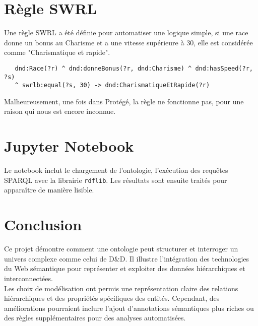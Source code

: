 \documentclass{article}
\newcommand{\cmd}[1]{\texttt{#1}}
\begin{document}
\section{Règle SWRL}

Une règle SWRL a été définie pour automatiser une logique simple, si une race donne un bonus au Charisme et a une vitesse supérieure à 30, elle est considérée comme "Charismatique et rapide".

\begin{lstlisting}
   dnd:Race(?r) ^ dnd:donneBonus(?r, dnd:Charisme) ^ dnd:hasSpeed(?r, ?s)
   ^ swrlb:equal(?s, 30) -> dnd:CharismatiqueEtRapide(?r)
\end{lstlisting}

Malheureusement, une fois dans Protégé, la règle ne fonctionne pas, pour une raison qui nous est encore inconnue.

\section{Jupyter Notebook}

Le notebook inclut le chargement de l'ontologie, l'exécution des requêtes SPARQL avec la librairie \cmd{rdflib}. Les résultats sont ensuite traités pour apparaître de manière lisible.

\section{Conclusion}

Ce projet démontre comment une ontologie peut structurer et interroger un univers complexe comme celui de D\&D. Il illustre l'intégration des technologies du Web sémantique pour représenter et exploiter des données hiérarchiques et interconnectées.\\

Les choix de modélisation ont permis une représentation claire des relations hiérarchiques et des propriétés spécifiques des entités. Cependant, des améliorations pourraient inclure l'ajout d'annotations sémantiques plus riches ou des règles supplémentaires pour des analyses automatisées.
\end{document}
